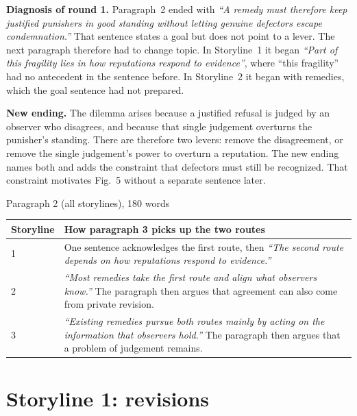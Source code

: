 \documentclass[11pt]{article}
\newcommand{\old}[1]{\textit{``#1''}}
\begin{document}
\textbf{Diagnosis of round 1.} Paragraph~2 ended with \old{A remedy must therefore keep justified punishers in good standing without letting genuine defectors escape condemnation.} That sentence states a goal but does not point to a lever. The next paragraph therefore had to change topic. In Storyline~1 it began \old{Part of this fragility lies in how reputations respond to evidence}, where ``this fragility'' had no antecedent in the sentence before. In Storyline~2 it began with remedies, which the goal sentence had not prepared.

\textbf{New ending.} The dilemma arises because a justified refusal is judged by an observer who disagrees, and because that single judgement overturns the punisher's standing. There are therefore two levers: remove the disagreement, or remove the single judgement's power to overturn a reputation. The new ending names both and adds the constraint that defectors must still be recognized. That constraint motivates Fig.~5 without a separate sentence later.

\begin{draft}{Paragraph 2 (all storylines), 180 words}

\end{draft}

\begin{center}\small
\begin{tabularx}{\linewidth}{@{}l L@{}}
\toprule
Storyline & How paragraph 3 picks up the two routes \\
 & One sentence acknowledges the first route, then \emph{``The second route depends on how reputations respond to evidence.''} \\
2 & \emph{``Most remedies take the first route and align what observers know.''} The paragraph then argues that agreement can also come from private revision. \\
3 & \emph{``Existing remedies pursue both routes mainly by acting on the information that observers hold.''} The paragraph then argues that a problem of judgement remains. \\
\bottomrule
\end{tabularx}
\end{center}

\section{Storyline 1: revisions}
\end{document}
